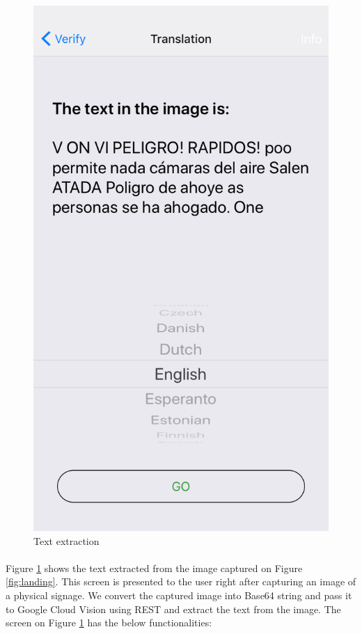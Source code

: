 \documentclass[12pt]{article}
\begin{document}
\begin{figure} [H]
\begin{minipage}{.5\textwidth}
  \includegraphics[width=0.9\linewidth]{media/2.PNG}
  \caption{Text extraction}
  \label{fig:ocr}
\end{minipage}
\end{figure}



\paragraph{}Figure \ref{fig:ocr} shows the text extracted from the image captured on Figure \ref{fig:landing}. This screen is presented to the user right after capturing an image of a physical signage. We convert the captured image into Base64 string and pass it to Google Cloud Vision using REST and extract the text from the image. The screen on Figure \ref{fig:ocr} has the below functionalities: 
\end{document}
